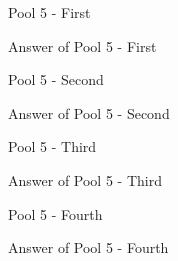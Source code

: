 \begin{question}
Pool 5 - First
\end{question}
\begin{solution}
Answer of Pool 5 - First
\end{solution}

\begin{question}
Pool 5 - Second
\end{question}
\begin{solution}
Answer of Pool 5 - Second
\end{solution}

\begin{question}
Pool 5 - Third
\end{question}
\begin{solution}
Answer of Pool 5 - Third
\end{solution}

\begin{question}
Pool 5 - Fourth
\end{question}
\begin{solution}
Answer of Pool 5 - Fourth
\end{solution}
